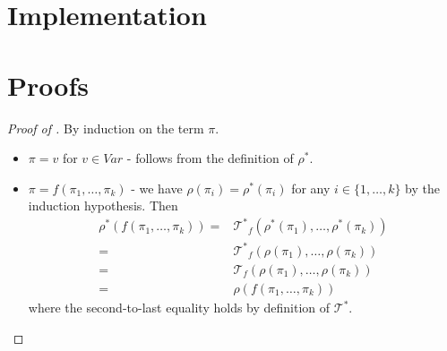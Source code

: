 \documentclass{article}
\begin{document}
\section{Implementation}




\appendix

\section{Proofs}


\begin{proof}[Proof of ]
    By induction on the term $\pi$.
    \begin{itemize}
        \item $\pi = v$ for $v \in \mathit{Var}$ - follows from the definition of $\rho^*$.
        \item $\pi = f(\pi_1, \ldots, \pi_k)$ - we have $\rho(\pi_i) = \rho^*(\pi_i)$ for any $i \in \{ 1, \ldots, k \}$
              by the induction hypothesis.
              Then
              \begin{align*}
                  \rho^*(f(\pi_1, \ldots, \pi_k)) 
                  = & {\mathcal{T}^*}_f(\rho^*(\pi_1), \ldots, \rho^*(\pi_k)) \\
                  = & {\mathcal{T}^*}_f(\rho(\pi_1), \ldots, \rho(\pi_k)) \\
                  = & \mathcal{T}_f(\rho(\pi_1), \ldots, \rho(\pi_k)) \\
                  = & \rho(f(\pi_1, \ldots, \pi_k))
              \end{align*}
              where the second-to-last equality holds by definition of $\mathcal{T}^*$.
    \end{itemize}
\end{proof}
\end{document}
